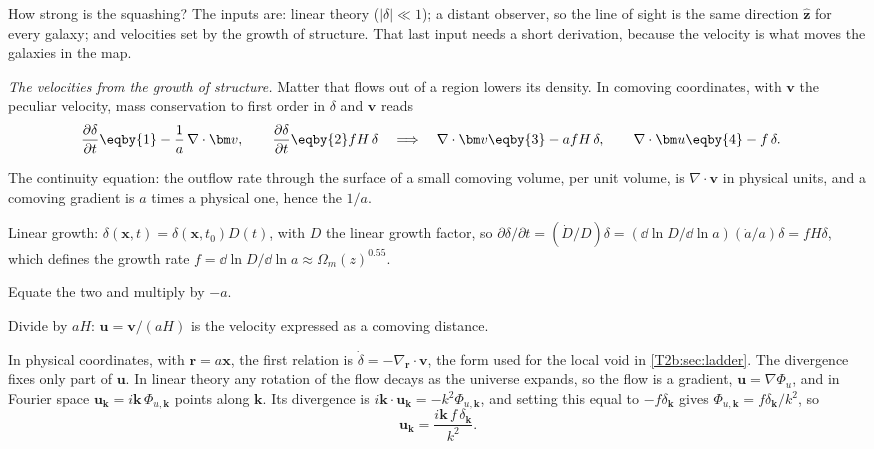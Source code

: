 How strong is the squashing? The inputs are: linear theory ($|\delta|\ll1$); a distant observer, so the line of sight is the same direction $\hat{\bm z}$ for every galaxy; and velocities set by the growth of structure. That last input needs a short derivation, because the velocity is what moves the galaxies in the map.

\emph{The velocities from the growth of structure.} Matter that flows out of a region lowers its density. In comoving coordinates, with $\bm v$ the peculiar velocity, mass conservation to first order in $\delta$ and $\bm v$ reads
\begin{align}
  \frac{\partial\delta}{\partial t}
  &\eqby{1}-\frac1a\,\nabla\cdot\bm v,
  \qquad
  \frac{\partial\delta}{\partial t}\eqby{2}fH\,\delta
  \quad\Longrightarrow\quad
  \nabla\cdot\bm v\eqby{3}-afH\,\delta,
  \qquad
  \nabla\cdot\bm u\eqby{4}-f\,\delta .
  \label{T2b:eq:continuity}
\end{align}
\begin{explain}
  \item The continuity equation: the outflow rate through the surface of a small comoving volume, per unit volume, is $\nabla\cdot\bm v$ in physical units, and a comoving gradient is $a$ times a physical one, hence the $1/a$.
  \item Linear growth: $\delta(\bm x,t)=\delta(\bm x,t_0)D(t)$, with $D$ the linear growth factor, so $\partial\delta/\partial t=(\dot D/D)\delta=(\dd\ln D/\dd\ln a)(\dot a/a)\delta=fH\delta$, which defines the growth rate $f=\dd\ln D/\dd\ln a\approx\Omega_m(z)^{0.55}$.
  \item Equate the two and multiply by $-a$.
  \item Divide by $aH$: $\bm u=\bm v/(aH)$ is the velocity expressed as a comoving distance.
\end{explain}
In physical coordinates, with $\bm r=a\bm x$, the first relation is $\dot\delta=-\nabla_{\bm r}\cdot\bm v$, the form used for the local void in \cref{T2b:sec:ladder}. The divergence fixes only part of $\bm u$. In linear theory any rotation of the flow decays as the universe expands, so the flow is a gradient, $\bm u=\nabla\Phi_u$, and in Fourier space $\bm u_{\bm k}=i\bm k\,\Phi_{u,\bm k}$ points along $\bm k$. Its divergence is $i\bm k\cdot\bm u_{\bm k}=-k^2\Phi_{u,\bm k}$, and setting this equal to $-f\delta_{\bm k}$ gives $\Phi_{u,\bm k}=f\delta_{\bm k}/k^2$, so
\[
  \bm u_{\bm k}=\frac{i\bm k\,f\,\delta_{\bm k}}{k^2}.
\]

